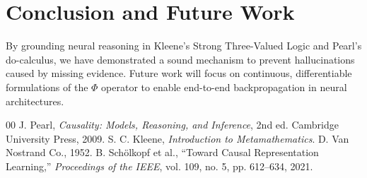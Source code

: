 \documentclass[conference]{IEEEtran}
\begin{document}
\section{Conclusion and Future Work}
By grounding neural reasoning in Kleene's Strong Three-Valued Logic and Pearl's do-calculus, we have demonstrated a sound mechanism to prevent hallucinations caused by missing evidence. Future work will focus on continuous, differentiable formulations of the $\Phi$ operator to enable end-to-end backpropagation in neural architectures.


\begin{thebibliography}{00}
 J. Pearl, \textit{Causality: Models, Reasoning, and Inference}, 2nd ed. Cambridge University Press, 2009.
 S. C. Kleene, \textit{Introduction to Metamathematics}. D. Van Nostrand Co., 1952.
 B. Sch\"olkopf et al., ``Toward Causal Representation Learning,'' \textit{Proceedings of the IEEE}, vol. 109, no. 5, pp. 612--634, 2021.
\end{thebibliography}
\end{document}
